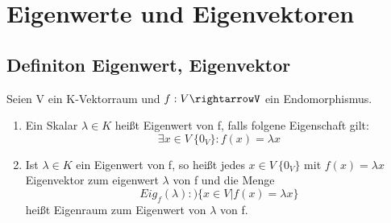 
\section{Eigenwerte und Eigenvektoren}

\subsection{Definiton Eigenwert, Eigenvektor}
Seien V ein K-Vektorraum und $f:V\rightarrowV$ ein Endomorphismus.
\begin{enumerate}[label=(\alph*)]
    \item Ein Skalar $\lambda \in K$ heißt Eigenwert von f, falls folgene Eigenschaft gilt: \[\exists x \in V \  \{ 0_V\} : f(x)=\lambda x \]
    \item Ist $\lambda \in K$ ein Eigenwert von f, so heißt jedes $x \in V \ \{0_V\}$ mit $f(x) = \lambda x$
    Eigenvektor zum eigenwert $\lambda $ von f und die Menge
    \[Eig_f(\lambda) :) \{x\in V | f(x) = \lambda x\}\] heißt Eigenraum zum Eigenwert von $\lambda$ von f.
\end{enumerate}